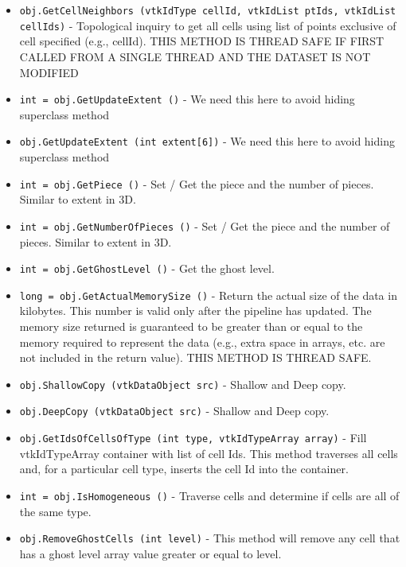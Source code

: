 \begin{itemize}
\item  \verb|obj.GetCellNeighbors (vtkIdType cellId, vtkIdList ptIds, vtkIdList cellIds)| -  Topological inquiry to get all cells using list of points exclusive of
 cell specified (e.g., cellId).
 THIS METHOD IS THREAD SAFE IF FIRST CALLED FROM A SINGLE THREAD AND
 THE DATASET IS NOT MODIFIED

\item  \verb|int = obj.GetUpdateExtent ()| -  We need this here to avoid hiding superclass method

\item  \verb|obj.GetUpdateExtent (int extent[6])| -  We need this here to avoid hiding superclass method

\item  \verb|int = obj.GetPiece ()| -  Set / Get the piece and the number of pieces. Similar to extent in 3D.

\item  \verb|int = obj.GetNumberOfPieces ()| -  Set / Get the piece and the number of pieces. Similar to extent in 3D.

\item  \verb|int = obj.GetGhostLevel ()| -  Get the ghost level.

\item  \verb|long = obj.GetActualMemorySize ()| -  Return the actual size of the data in kilobytes. This number
 is valid only after the pipeline has updated. The memory size
 returned is guaranteed to be greater than or equal to the
 memory required to represent the data (e.g., extra space in
 arrays, etc. are not included in the return value). THIS METHOD
 IS THREAD SAFE.

\item  \verb|obj.ShallowCopy (vtkDataObject src)| -  Shallow and Deep copy.

\item  \verb|obj.DeepCopy (vtkDataObject src)| -  Shallow and Deep copy.

\item  \verb|obj.GetIdsOfCellsOfType (int type, vtkIdTypeArray array)| -  Fill vtkIdTypeArray container with list of cell Ids.  This
 method traverses all cells and, for a particular cell type,
 inserts the cell Id into the container.

\item  \verb|int = obj.IsHomogeneous ()| -  Traverse cells and determine if cells are all of the same type.

\item  \verb|obj.RemoveGhostCells (int level)| -  This method will remove any cell that has a ghost level array value
 greater or equal to level.

\end{itemize}
